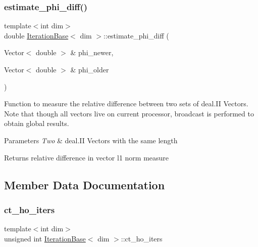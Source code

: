 \subsubsection{\texorpdfstring{estimate\+\_\+phi\+\_\+diff()}{estimate\_phi\_diff()}\hspace{0.1cm}{\footnotesize\ttfamily [4/4]}}
{\footnotesize\ttfamily template$<$int dim$>$ \\
double \hyperlink{class_iteration_base}{Iteration\+Base}$<$ dim $>$\+::estimate\+\_\+phi\+\_\+diff (\begin{DoxyParamCaption}\item[{Vector$<$ double $>$ \&}]{phi\+\_\+newer,  }\item[{Vector$<$ double $>$ \&}]{phi\+\_\+older }\end{DoxyParamCaption})\hspace{0.3cm}{\ttfamily [protected]}}

Function to measure the relative difference between two sets of deal.\+II Vectors. Note that though all vectors live on current processor, broadcast is performed to obtain global results.


\begin{DoxyParams}{Parameters}
{\em Two} & deal.\+II Vectors with the same length \\
\hline
\end{DoxyParams}
\begin{DoxyReturn}{Returns}
relative difference in vector l1 norm measure 
\end{DoxyReturn}


\subsection{Member Data Documentation}
\mbox{\label{class_iteration_base_afd007145fe5b7bfe22012c44c20d31a4}} 
\subsubsection{\texorpdfstring{ct\+\_\+ho\+\_\+iters}{ct\_ho\_iters}}
{\footnotesize\ttfamily template$<$int dim$>$ \\
unsigned int \hyperlink{class_iteration_base}{Iteration\+Base}$<$ dim $>$\+::ct\+\_\+ho\+\_\+iters\hspace{0.3cm}{\ttfamily [protected]}}

